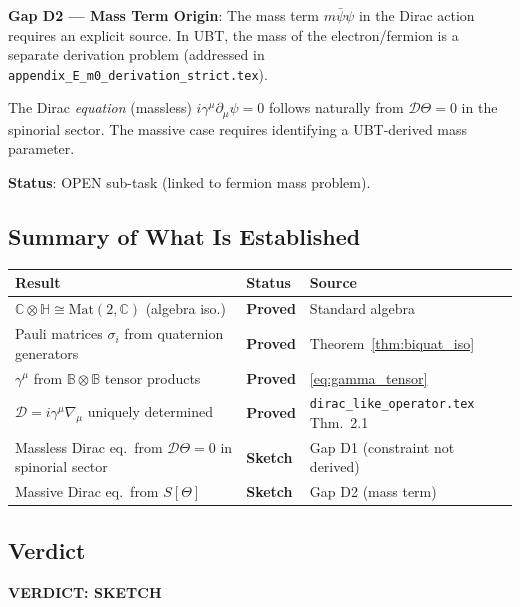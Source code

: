 \documentclass[12pt]{article}
\theoremstyle{definition}
\theoremstyle{remark}
\begin{document}
\begin{gapbox}
\textbf{Gap D2 — Mass Term Origin}:
The mass term $m\bar\psi\psi$ in the Dirac action requires an explicit source.
In UBT, the mass of the electron/fermion is a separate derivation problem
(addressed in \texttt{appendix\_E\_m0\_derivation\_strict.tex}).

The Dirac \emph{equation} (massless) $i\gamma^\mu\partial_\mu\psi=0$ follows naturally
from $\mathcal{D}\Theta = 0$ in the spinorial sector.  The massive case requires identifying
a UBT-derived mass parameter.

\textbf{Status}: OPEN sub-task (linked to fermion mass problem).
\end{gapbox}

\subsection{Summary of What Is Established}

\begin{center}
\renewcommand{\arraystretch}{1.3}
\begin{tabular}{lll}
\hline
\textbf{Result} & \textbf{Status} & \textbf{Source} \\
\hline
$\mathbb{C}\otimes\mathbb{H}\cong\mathrm{Mat}(2,\mathbb{C})$ (algebra iso.)
  & \textbf{Proved} & Standard algebra \\
Pauli matrices $\sigma_i$ from quaternion generators
  & \textbf{Proved} & Theorem~\ref{thm:biquat_iso} \\
$\gamma^\mu$ from $\mathbb{B}\otimes\mathbb{B}$ tensor products
  & \textbf{Proved} & \eqref{eq:gamma_tensor} \\
$\mathcal{D} = i\gamma^\mu\nabla_\mu$ uniquely determined
  & \textbf{Proved} & \texttt{dirac\_like\_operator.tex} Thm.~2.1 \\
Massless Dirac eq.\ from $\mathcal{D}\Theta=0$ in spinorial sector
  & \textbf{Sketch} & Gap D1 (constraint not derived) \\
Massive Dirac eq.\ from $S[\Theta]$
  & \textbf{Sketch} & Gap D2 (mass term) \\
\hline
\end{tabular}
\end{center}

\subsection{Verdict}

\begin{center}
\large\textbf{VERDICT: SKETCH}
\end{center}
\end{document}
